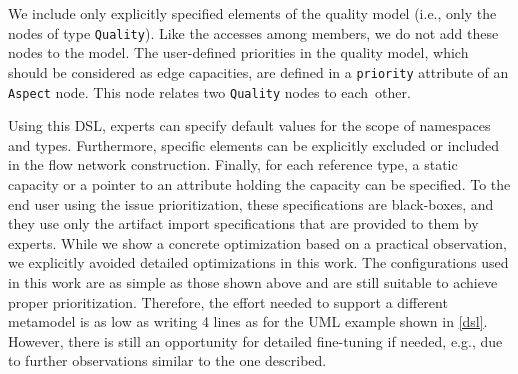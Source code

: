 
We include only explicitly specified elements of the quality model (i.e., only the nodes of type \texttt{Quality}).
Like the accesses among members, we do not add these nodes to the model.
The user-defined priorities in the quality model, which should be considered as edge capacities, are defined in a \texttt{priority} attribute of an \texttt{Aspect} node.
This node relates two \texttt{Quality} nodes to each~other.

Using this DSL, experts can specify default values for the scope of namespaces and types.
Furthermore, specific elements can be explicitly excluded or included in the flow network construction.
Finally, for each reference type, a static capacity or a pointer to an attribute holding the capacity can be specified.
To the end user using the \appr{} issue prioritization, these specifications are black-boxes, and they use only the artifact import specifications that are provided to them by experts.
	While we show a concrete optimization based on a practical observation, we explicitly avoided detailed optimizations in this work.
	The configurations used in this work are as simple as those shown above and are still suitable to achieve proper prioritization.
	Therefore, the effort needed to support a different metamodel is as low as writing 4 lines as for the UML example shown in \autoref{dsl}.
	However, there is still an opportunity for detailed fine-tuning if needed, e.g., due to further observations similar to the one described.
